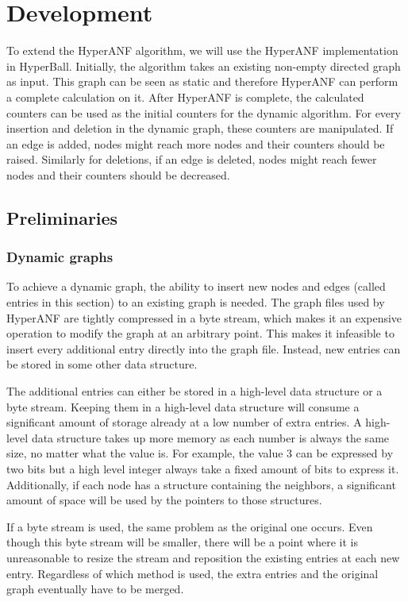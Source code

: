 \chapter{Development}
To extend the HyperANF algorithm, we will use the HyperANF implementation in HyperBall. Initially, the algorithm takes an existing non-empty directed graph as input. This graph can be seen as static and therefore HyperANF can perform a complete calculation on it. After HyperANF is complete, the calculated counters can be used as the initial counters for the dynamic algorithm. For every insertion and deletion in the dynamic graph, these counters are manipulated. If an edge is added, nodes might reach more  nodes and their counters should be raised. Similarly for deletions, if an edge is deleted, nodes might reach fewer nodes and their counters should be decreased.

\section{Preliminaries}

\subsection{Dynamic graphs}

To achieve a dynamic graph, the ability to insert new nodes and edges (called entries in this section) to an existing graph is needed. The graph files used by HyperANF are tightly compressed in a byte stream, which makes it an expensive operation to modify the graph at an arbitrary point. This makes it infeasible to insert every additional entry directly into the graph file. Instead, new entries can be stored in some other data structure.

The additional entries can either be stored in a high-level data structure or a byte stream. Keeping them in a high-level data structure will consume a significant amount of storage already at a low number of extra entries. A high-level data structure takes up more memory as each number is always the same size, no matter what the value is. For example, the value 3 can be expressed by two bits but a high level integer always take a fixed amount of bits to express it.  Additionally, if each node has a structure containing the neighbors, a significant amount of space will be used by the pointers to those structures. 

If a byte stream is used, the same problem as the original one occurs. Even though this byte stream will be smaller, there will be a point where it is unreasonable to resize the stream and reposition the existing entries at each new entry. Regardless of which method is used, the extra entries and the original graph eventually have to be merged.

